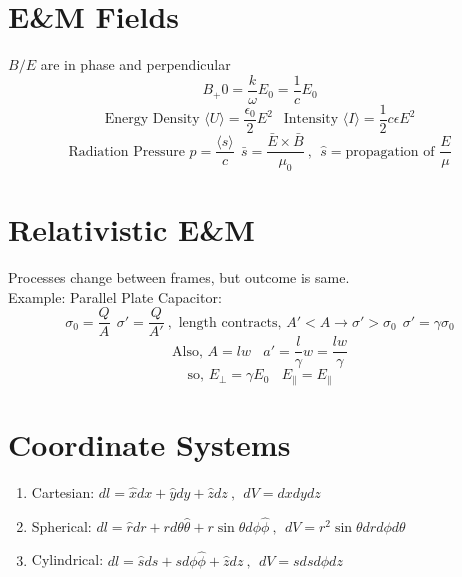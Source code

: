 \documentclass[10pt,letter]{article}
\begin{document}
\section{E\&M Fields} %
\label{sec:e&m_fields}
$B/E$ are in phase and perpendicular
\begin{equation}
    B_+0 = \frac{k}{\omega}E_0 = \frac{1}{c}E_0
\end{equation}
\begin{equation}
    \textrm{Energy Density } \langle U \rangle = \frac{\epsilon_0}{2}E^2~~ \textrm{ Intensity }\langle I \rangle = \frac{1}{2}c\epsilon E^2
\end{equation}
\begin{equation}
    \textrm{Radiation Pressure } p = \frac{\langle s \rangle}{c}~~ \bar{s} = \frac{\bar{E} \times \bar{B}}{\mu_0}~,~~\hat{s} = \textrm{propagation of } \frac{E}{\mu}
\end{equation}

\section{Relativistic E\&M} %
\label{sec:relativistic_e&m}
Processes change between frames, but outcome is same. \\
Example: Parallel Plate Capacitor:
\begin{equation}
    \sigma_0 = \frac{Q}{A}~~ \sigma' = \frac{Q}{A'}~, \textrm{ length contracts, }A' < A \rightarrow \sigma'
 > \sigma_0~~ \sigma' = \gamma \sigma_0
\end{equation}
\begin{equation}
    \textrm{Also, }A = lw~~~~a' = \frac{l}{\gamma}w = \frac{lw}{\gamma}
\end{equation}
\begin{equation}
    \textrm{so, }E_\perp = \gamma E_0 ~~~~ E_\parallel = E_\parallel
\end{equation}

\section{Coordinate Systems} %
\label{sec:coordinate_systems}
\begin{enumerate}
    \item Cartesian: $dl = \hat{x} dx + \hat{y} dy + \hat{z}dz~,~~dV = dxdydz$
    \item Spherical: $dl = \hat{r}dr + rd\theta \hat{\theta} + r\sin \theta d\phi \hat{\phi}~,~~dV = r^2 \sin \theta dr d\phi d\theta$
    \item Cylindrical: $dl = \hat{s} ds  +sd\phi \hat{\phi} + \hat{z}dz ~,~~ dV = sdsd\phi dz$
\end{enumerate}
\end{document}
